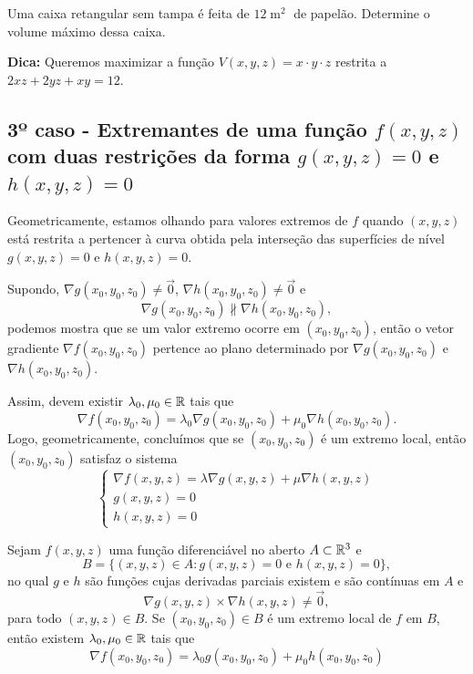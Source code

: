 \begin{exercise}
    Uma caixa retangular sem tampa é feita de \(12\operatorname{m}^2\) de papelão. Determine o volume máximo dessa caixa.

    \textbf{Dica: } Queremos maximizar a função \(V(x,y,z) = x\cdot y\cdot z\) restrita a \(2xz + 2yz + xy = 12\).
\end{exercise}

\subsection{3º caso - Extremantes de uma função \texorpdfstring{\(f(x,y,z)\)}{f(x,y,z)} com duas restrições da forma \texorpdfstring{\(g(x,y,z) = 0\)}{g(x,y,z)=0} e \texorpdfstring{\(h(x,y,z)=0\)}{h(x,y,z)=0}}

Geometricamente, estamos olhando para valores extremos de \(f\) quando \((x,y,z)\) está restrita a pertencer à curva obtida pela interseção das superfícies de nível \(g(x,y,z) = 0\) e \(h(x,y,z) = 0\).

Supondo, \(\nabla g(x_0,y_0,z_0)\neq\overrightarrow{0}\), \(\nabla h(x_0,y_0,z_0)\neq\overrightarrow{0}\) e \[\nabla g(x_0,y_0,z_0) \not\parallel \nabla h(x_0,y_0,z_0),\] podemos mostra que se um valor extremo ocorre em \((x_0,y_0,z_0)\), então o vetor gradiente \(\nabla f(x_0,y_0,z_0)\) pertence ao plano determinado por \(\nabla g(x_0,y_0,z_0)\) e \(\nabla h(x_0,y_0,z_0)\).

Assim, devem existir \(\lambda_0,\mu_0\in\mathbb{R}\) tais que \[\nabla f(x_0,y_0,z_0) = \lambda_0 \nabla g(x_0,y_0,z_0) + \mu_0 \nabla h(x_0,y_0,z_0).\] Logo, geometricamente, concluímos que se \((x_0,y_0,z_0)\) é um extremo local, então \((x_0,y_0,z_0)\) satisfaz o sistema \[\begin{cases}
    \nabla f(x,y,z) = \lambda \nabla g(x,y,z) + \mu \nabla h(x,y,z) \\
    g(x,y,z) = 0 \\
    h(x,y,z) = 0
\end{cases}\]

\begin{theorem}\label{thm.MultiplicadoresLagrange2}
    Sejam \(f(x,y,z)\) uma função diferenciável no aberto \(A\subset\mathbb{R}^3\) e \[B = \{(x,y,z)\in A: g(x,y,z) = 0 \text{ e } h(x,y,z) = 0\},\] no qual \(g\) e \(h\) são funções cujas derivadas parciais existem e são contínuas em \(A\) e \[\nabla g(x,y,z) \times \nabla h(x,y,z) \neq \overrightarrow{0},\] para todo \((x,y,z)\in B\). Se \((x_0,y_0,z_0)\in B\) é um extremo local de \(f\) em \(B\), então existem \(\lambda_0,\mu_0\in\mathbb{R}\) tais que \[\nabla f(x_0,y_0,z_0) = \lambda_0 g(x_0,y_0,z_0) + \mu_0 h(x_0,y_0,z_0)\]
\end{theorem}

